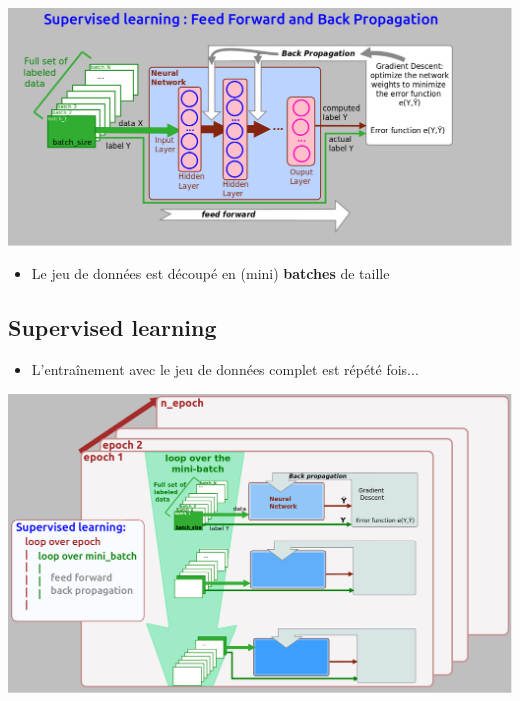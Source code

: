 \documentclass[10pt,serif,mathserif,compress,hyperref={colorlinks}]{beamer}
\begin{document}
\begin{frame}{}
  \includegraphics[width=1.2\textwidth]{./images/NetworkTraining.png}
  \begin{itemize}
  \item Le jeu de données est découpé en (mini) {\bf batches} de taille 
  \end{itemize}
\end{frame}

\subsection{Supervised learning}

\begin{frame}{}
  
  \begin{itemize}
  \item L'entraînement avec le jeu de données complet est répété  fois...
  \end{itemize}
  \includegraphics[width=\textwidth]{./images/NetworkTraining_2.png}
  
\end{frame}
\end{document}

